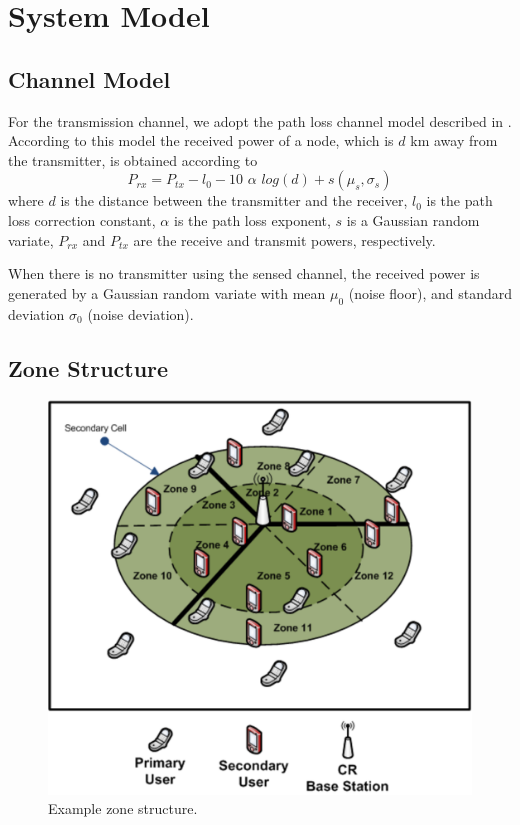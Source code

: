 \documentclass[conference,compsoc]{IEEEtran}
\newcommand{\beqn}{\begin{equation}}
\newcommand{\eeqn}{\end{equation}}
\begin{document}
\section{\label{sec:system_model}System Model}
\subsection{Channel Model}
For the transmission channel, we adopt the path loss channel model described in \cite{faramir}. According to this model the received power of a node, which is $d$ km away from the transmitter, is obtained according to\\
\beqn
    P_{rx} = P_{tx} - l_0 - 10\,\, \alpha \,\, log(d) + s(\mu_s, \sigma_s)
\eeqn
where $d$ is the distance between the transmitter and the receiver, $l_0$ is the path loss correction constant, $\alpha$ is the path loss exponent, $s$ is a Gaussian random variate,  $P_{rx}$ and $P_{tx}$ are the receive and transmit powers, respectively.

When there is no transmitter using the sensed channel, the received power is generated by a Gaussian random variate with mean $\mu_0$ (noise floor), and standard deviation $\sigma_0$ (noise deviation).

\subsection{Zone Structure}

\begin{figure}[!htb]
\centering
\includegraphics[width=0.99\columnwidth,keepaspectratio] {figs/cellStructure.eps}
\caption{Example zone structure.} \label{fig:zone_structure}
\end{figure}
\end{document}
